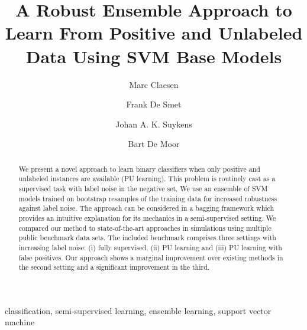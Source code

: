\documentclass[preprint,elsarticle-num,12pt]{elsarticle}
\begin{document}
\begin{frontmatter}
 \title{A Robust Ensemble Approach to Learn From Positive and Unlabeled Data Using SVM Base Models}
 
 \author[stadius]{Marc Claesen}
 
 \author[pubhealth]{Frank De Smet}
 
 \author[stadius]{Johan A. K. Suykens}

 \author[stadius]{Bart De Moor}
 
 
 \address[stadius]{KU Leuven, ESAT -- STADIUS/iMinds Medical IT  \\
Kasteelpark Arenberg 10, box 2446 \\
3001 Leuven, Belgium}
 \address[pubhealth]{KU Leuven, Department of Public Health and Primary Care, Environment and Health \\
Kapucijnenvoer 35 blok d, box 7001 \\
3000 Leuven, Belgium}

\begin{abstract}%
We present a novel approach to learn binary classifiers when only positive and unlabeled instances are available (PU learning). This problem is routinely cast as a supervised task with label noise in the negative set. We use an ensemble of SVM models trained on bootstrap resamples of the training data for increased robustness against label noise. The approach can be considered in a bagging framework which provides an intuitive explanation for its mechanics in a semi-supervised setting. We compared our method to state-of-the-art approaches in simulations using multiple public benchmark data sets. The included benchmark comprises three settings with increasing label noise: (i) fully supervised, (ii) PU learning and (iii) PU learning with false positives. Our approach shows a marginal improvement over existing methods in the second setting and a significant improvement in the third.
\end{abstract}

\begin{keyword}
  classification, semi-supervised learning, ensemble learning, support vector
  machine
\end{keyword}


\end{frontmatter}
\end{document}
